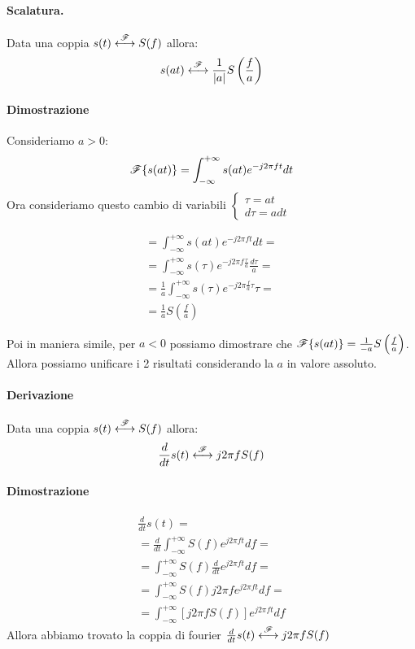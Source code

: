 


\paragraph{Scalatura.}Data una coppia $s(t) \overset{{\mathscr{F}}}{\longleftrightarrow} S(f)$ allora:
\begin{equation}
    s(at) \overset{{\mathscr{F}}}{\longleftrightarrow} \frac{1}{|a|}S\left(\frac{f}{a}\right)
\end{equation}

\paragraph{Dimostrazione}
Consideriamo $a > 0$:
\begin{equation*}
    {\mathscr{F}}\{s(at)\} = \int_{-\infty}^{+\infty}s(at)e^{-j2 \pi ft}dt
\end{equation*}
Ora consideriamo questo cambio di variabili $
    \begin{cases}
        \tau = at\\
        d\tau = adt
    \end{cases}
$

\begin{gather*}
    =\int_{-\infty}^{+\infty}s(at)e^{-j2 \pi ft}dt=\\
    =\int_{-\infty}^{+\infty}s(\tau)e^{-j2 \pi f\frac{\tau}{a}}\frac{d\tau}{a}=\\
    = \frac{1}{a} \int_{-\infty}^{+\infty}s(\tau)e^{-j2 \pi \frac{f}{a} \tau} \tau=\\
    = \frac{1}{a} S\left(\frac{f}{a}\right)
\end{gather*}

Poi in maniera simile, per $a < 0$ possiamo dimostrare che ${\mathscr{F}}\{s(at)\} = \frac{1}{-a} S\left(\frac{f}{a}\right)$.
Allora possiamo unificare i 2 risultati considerando la $a$ in valore assoluto.

\paragraph{Derivazione}
Data una coppia $s(t) \overset{{\mathscr{F}}}{\longleftrightarrow} S(f)$ allora:
\begin{equation}
    \frac{d}{dt}s(t) \overset{{\mathscr{F}}}{\longleftrightarrow} j2\pi f S(f)
\end{equation}
\paragraph{Dimostrazione}
\begin{gather*}
    \frac{d}{dt}s(t) =\\
    = \frac{d}{dt} \int_{-\infty}^{+\infty} S(f) e^{j2 \pi ft}df =\\ \tag{formula di Sintesi}
    = \int_{-\infty}^{+\infty} S(f) \frac{d}{dt} e^{j2 \pi ft} df =\\
    = \int_{-\infty}^{+\infty} S(f) j2\pi f e^{j2 \pi ft} df =\\
    =  \int_{-\infty}^{+\infty} [j2\pi f S(f)] e^{j2 \pi ft} df
\end{gather*}
Allora abbiamo trovato la coppia di fourier $\frac{d}{dt}s(t) \overset{{\mathscr{F}}}{\longleftrightarrow} j2\pi f S(f)$

